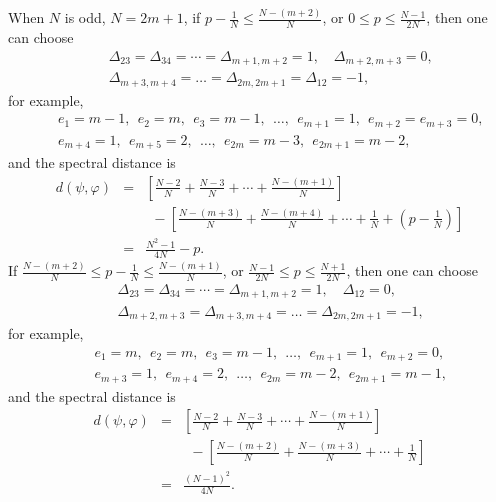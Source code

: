 \documentclass[a4paper,11pt]{article}
\begin{document}
When $N$ is odd, $N = 2 m + 1$, if $p - \frac{1}{N} \leqslant \frac{N - (m +
2)}{N}$, or $0 \leqslant p \leqslant \frac{N - 1}{2 N}$, then
one can choose
\begin{eqnarray}
&&\Delta_{23} = \Delta_{34} = \cdots = \Delta_{m + 1, m + 2} =
   1, \quad \Delta_{m + 2, m + 3} = 0, \nonumber\\
&&   \Delta_{m + 3, m
   + 4} = \ldots = \Delta_{2 m, 2 m + 1} = \Delta_{12} = -1,
\end{eqnarray}
for example,
\begin{eqnarray}
&&  e_1 = m-1,~~ e_2 = m,~~ e_3 = m-1,~~ \ldots,~~ e_{m + 1} = 1,~~ e_{m + 2} = e_{m + 3}
  = 0,
\nonumber\\
&&
  e_{m + 4} = 1,~~ e_{m + 5} = 2, ~~\ldots,~~ e_{2
  m} = m-3,~~ e_{2 m + 1} = m-2,
\end{eqnarray}
and the spectral distance is
\begin{eqnarray}
  d (\psi, \varphi) & = &  \left[ \frac{N - 2}{N} +
  \frac{N - 3}{N} + \cdots + \frac{N - (m + 1)}{N} \right]\nonumber\\
    &&~~ - \left[ \frac{N -
  (m + 3)}{N} + \frac{N - (m + 4)}{N} + \cdots + \frac{1}{N} + \left( p -
  \frac{1}{N} \right) \right]\nonumber\\
  & = & \frac{N^2 - 1}{4 N} - p .
\end{eqnarray}
If $\frac{N - (m + 2)}{N} \leqslant p - \frac{1}{N} \leqslant \frac{N - (m +
1)}{N}$, or $\frac{N - 1}{2 N} \leqslant p \leqslant \frac{N + 1}{2 N}$, then
one can choose
\begin{eqnarray}
&&\Delta_{23} = \Delta_{34} = \cdots = \Delta_{m + 1, m + 2} =
   1, \quad \Delta_{12} = 0, \nonumber\\
&& \Delta_{m + 2, m + 3} =
   \Delta_{m + 3, m + 4} = \ldots = \Delta_{2 m, 2 m + 1} = -
   1,
\end{eqnarray}
for example,
\begin{eqnarray}
&&  e_1 = m,~~ e_2 = m,~~ e_3 = m-1, ~~\ldots,~~ e_{m + 1} = 1,~~ e_{m + 2} = 0,
\nonumber\\
&& 
  e_{m + 3} = 1,~~ e_{m + 4} = 2,~~ \ldots,~~ e_{2
  m} = m-2, ~~e_{2 m + 1} = m-1,
\end{eqnarray}
and the spectral distance is
\begin{eqnarray}
  d (\psi, \varphi) & = &  \left[  \frac{N - 2}{N} +
  \frac{N - 3}{N} + \cdots + \frac{N - (m + 1)}{N} \right]\nonumber\\
    &&~~ - \left[ \frac{N -
  (m + 2)}{N} + \frac{N - (m + 3)}{N} + \cdots + \frac{1}{N}  \right]\nonumber\\
  & = & \frac{(N - 1)^2}{4 N} .
\end{eqnarray}
\end{document}
